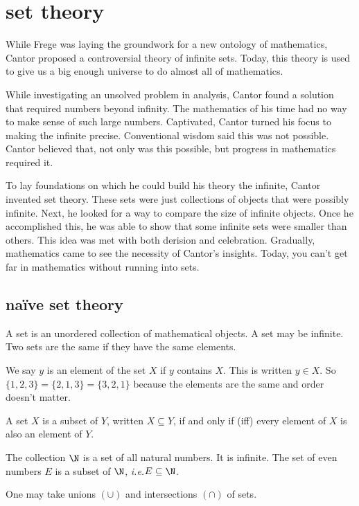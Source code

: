 \documentclass{scrbook}
\newcommand{\ie}{\emph{i.e.}\xspace}
\begin{document}
\chapter[Set theory]{set theory}
While Frege was laying the groundwork for a new ontology of mathematics, Cantor proposed a controversial theory of infinite sets. Today, this theory is used to give us a big enough universe to do almost all of mathematics.

While investigating an unsolved problem in analysis, Cantor found a solution that required numbers beyond infinity. 
The mathematics of his time had no way to make sense of such large numbers. Captivated, Cantor turned his focus to making the infinite precise. Conventional wisdom said this was not possible. Cantor believed that, not only was this possible, but progress in mathematics required it. 

To lay foundations on which he could build his theory the infinite, Cantor invented set theory. These sets were just collections of objects that were possibly infinite. Next, he looked for a way to compare the size of infinite objects. Once he accomplished this, he was able to show that some infinite sets were smaller than others. This idea was met with both derision and celebration. Gradually, mathematics came to see the necessity of Cantor's insights. Today, you can't get far in mathematics without running into sets. 
\section[Naïve set theory]{naïve set theory}
\begin{defn}
  A set is an unordered collection of mathematical objects. A set may be infinite. Two sets are the same if they have the same elements. 
\end{defn}
\begin{defn}[member]
  We say $y$ is an element of the set $X$ if $y$ contains $X$. This is written $y\in X$. So $\{1,2,3\}=\{2,1,3\}=\{3,2,1\}$ because the elements are the same and order doesn't matter. 
\end{defn}
\begin{defn}
  A set $X$ is a subset of $Y$, written $X\subseteq Y$, if and only if (iff) every element of $X$ is also an element of $Y$. 
\end{defn}
\begin{example}
  The collection $\N$ is a set of all natural numbers. It is infinite. The set of even numbers $E$ is a subset of $\N$, \ie $E\subseteq \N$. 
\end{example}
One may take unions $(\cup)$ and intersections $(\cap)$ of sets. 
\end{document}
